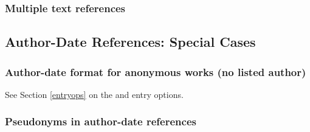 \documentclass[11pt,letterpaper,oneside]{article}
\begin{document}
\begin{citeref}
\item \parencite{schonen2017a}
\item \parencite{schonen2017b}
\end{citeref}

\subsubsection{Multiple text references}

\begin{citeref}
\item \parencite{armstrong1989,beigl1989,pickett1985}
\item \parencites{whittaker1967,whittaker1975,wiens1989a,wiens1989b}
\item \parencites[328]{wong1999}[475]{wong2000}[67]{garcia1998}
\end{citeref}

\setcounter{subsection}{2}
\subsection{Author-Date References: Special Cases}
\setcounter{subsection}{15}

\setcounter{subsubsection}{33}
\subsubsection{Author-date format for anonymous works (no listed author)}

See Section \ref{entryops} on the  and 
entry options.

\begin{citeref}
\item \parencite{anon1610}
\item \parencite{anon1547}
\item \parencite{horsley1796}
\item \parencite{hawkes1834}
\end{citeref}

\subsubsection{Pseudonyms in author-date references}

\begin{citeref}
\item \parencite{stendhal1925}
\end{citeref}
\end{document}
